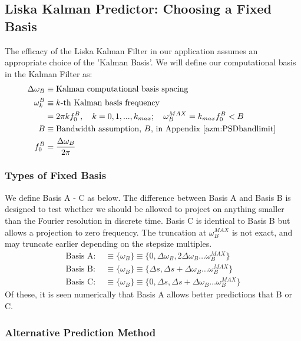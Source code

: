 \subsection{Liska Kalman Predictor: Choosing a Fixed Basis} \label{sec:ap_liska_fixedbasis}

The efficacy of the Liska Kalman Filter in our application assumes an appropriate choice of the 'Kalman Basis'. We will define our computational basis in the Kalman Filter as:
\begin{align}
\Delta \omega_B  &\equiv \text{Kalman computational basis spacing} \\
\omega_k^B &\equiv \text{$k$-th Kalman basis frequency} \\
&= 2 \pi k f_0^B, \quad k = 0, 1, ..., k_{max};  \quad \omega_B^{MAX} = k_{max} f_0^B < B \\
B  &\equiv \text{Bandwidth assumption, $B$,  in Appendix \ref{azm:PSDbandlimit} } \\
f_0^B &=  \frac{\Delta \omega_B}{2 \pi}
\end{align}

\subsubsection{Types of Fixed Basis}
We define Basis A - C as below. The  difference between Basis A and Basis B is designed to test whether we should be allowed to project on anything smaller than the Fourier resolution in discrete time. Basis C is identical to Basis B but allows a projection to zero frequency. The truncation at $\omega_B^{MAX}$ is not exact, and may truncate earlier depending on the stepsize multiples.
\begin{align}
\text{Basis A: } &\equiv \{\omega_B\} \equiv \{0, \Delta \omega_B, 2\Delta \omega_B \dots  \omega_B^{MAX}\} \\
\text{Basis B: } &\equiv \{\omega_B\} \equiv \{ \Delta s, \Delta s + \Delta \omega_B \dots  \omega_B^{MAX}\} \\
\text{Basis C: } &\equiv \{\omega_B\} \equiv \{ 0, \Delta s, \Delta s + \Delta \omega_B \dots  \omega_B^{MAX}\} 
\end{align}
Of these, it is seen numerically that Basis A allows better predictions that B or C.

\subsubsection{Alternative Prediction Method}

